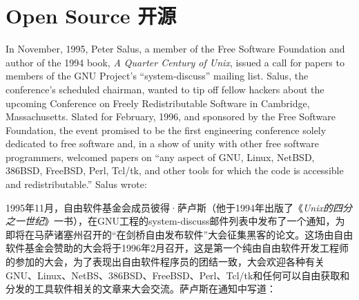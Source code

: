 

\chapter{\ifdefined\eng
Open Source
\fi
\ifdefined\chs
开源
\fi} \label{chapter:open source}

\ifdefined{}
\fi

\ifdefined{}
\fi

\ifdefined\eng
In November, 1995, Peter Salus, a member of the Free Software Foundation and author of the 1994 book, \textit{A Quarter Century of Unix}, issued a call for papers to members of the GNU Project's ``system-discuss'' mailing list. Salus, the conference's scheduled chairman, wanted to tip off fellow hackers about the upcoming Conference on Freely Redistributable Software in Cambridge, Massachusetts. Slated for February, 1996, and sponsored by the Free Software Foundation, the event promised to be the first engineering conference solely dedicated to free software and, in a show of unity with other free software programmers, welcomed papers on ``any aspect of GNU, Linux, NetBSD, 386BSD, FreeBSD, Perl, Tcl/tk, and other tools for which the code is accessible and redistributable.'' Salus wrote:
\fi

\ifdefined\chs
1995年11月，自由软件基金会成员彼得·萨卢斯（他于1994年出版了《\textit{Unix的四分之一世纪}》一书），在GNU工程的system-discuss邮件列表中发布了一个通知，为即将在马萨诸塞州召开的``在剑桥自由发布软件''大会征集黑客的论文。这场由自由软件基金会赞助的大会将于1996年2月召开，这是第一个纯由自由软件开发工程师的参加的大会，为了表现出自由软件程序员的团结一致，大会欢迎各种有关GNU、Linux、NetBS、386BSD、FreeBSD、Perl、Tcl/tk和任何可以自由获取和分发的工具软件相关的文章来大会交流。萨卢斯在通知中写道：
\fi

